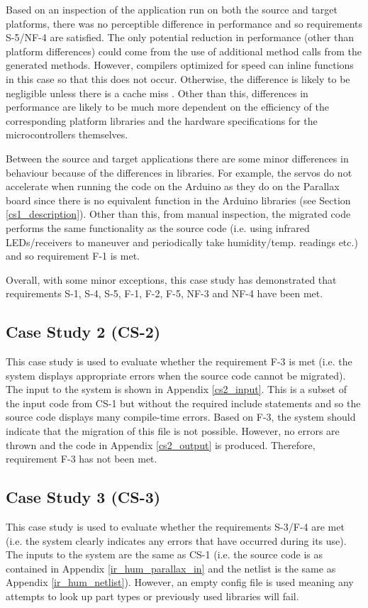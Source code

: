 \documentclass{UoYCSproject}
\begin{document}
Based on an inspection of the application run on both the source and target platforms, there was no perceptible difference in performance and so requirements S-5/NF-4 are satisfied. The only potential reduction in performance (other than platform differences) could come from the use of additional method calls from the generated methods. However, compilers optimized for speed can inline functions in this case so that this does not occur. Otherwise, the difference is likely to be negligible unless there is a cache miss \parencite{function_call_performance}. Other than this, differences in performance are likely to be much more dependent on the efficiency of the corresponding platform libraries and the hardware specifications for the microcontrollers themselves.

Between the source and target applications there are some minor differences in behaviour because of the differences in libraries. For example, the servos do not accelerate when running the code on the Arduino as they do on the Parallax board since there is no equivalent function in the Arduino libraries (see Section \ref{cs1_description}). Other than this, from manual inspection, the migrated code performs the same functionality as the source code (i.e. using infrared LEDs/receivers to maneuver and periodically take humidity/temp. readings etc.) and so requirement F-1 is met.

Overall, with some minor exceptions, this case study has demonstrated that requirements S-1, S-4, S-5, F-1, F-2, F-5, NF-3 and NF-4 have been met.

\subsection{Case Study 2 (CS-2)} \label{cs2}
This case study is used to evaluate whether the requirement F-3 is met (i.e. the system displays appropriate errors when the source code cannot be migrated). The input to the system is shown in Appendix \ref{cs2_input}. This is a subset of the input code from CS-1 but without the required include statements and so the source code displays many compile-time errors. Based on F-3, the system should indicate that the migration of this file is not possible. However, no errors are thrown and the code in Appendix \ref{cs2_output} is produced. Therefore, requirement F-3 has not been met.

\subsection{Case Study 3 (CS-3)} \label{cs3}
This case study is used to evaluate whether the requirements S-3/F-4 are met (i.e. the system clearly indicates any errors that have occurred during its use). The inputs to the system are the same as CS-1 (i.e. the source code is as contained in Appendix \ref{ir_hum_parallax_in} and the netlist is the same as Appendix \ref{ir_hum_netlist}). However, an empty config file is used meaning any attempts to look up part types or previously used libraries will fail. 
\end{document}
